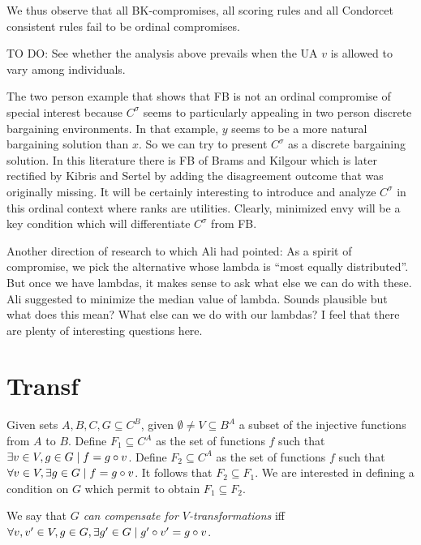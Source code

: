\documentclass[version=3.21, pagesize, notitlepage, twoside=off, bibliography=totoc, DIV=calc, fontsize=12pt, a4paper]{scrartcl}
\begin{document}
We thus observe that all BK-compromises, all scoring rules and all Condorcet consistent rules fail to be ordinal compromises.

TO DO: See whether the analysis above prevails when the UA $v$ is allowed to vary among individuals.

The two person example that shows that FB is not an ordinal compromise of special interest because $C^{\sigma }$ seems to particularly appealing in two person discrete bargaining environments. In that example, $y$ seems to be a more natural bargaining solution than $x$. So we can try to present $C^{\sigma }$ as a discrete bargaining solution. In this literature there is FB of Brams and Kilgour which is later rectified by Kibris and Sertel \cite{Sertel1999} by adding the disagreement outcome that was originally missing. It will be certainly interesting to introduce and analyze $C^{\sigma }$ in this ordinal context where ranks are utilities. Clearly, minimized envy will be a key condition which will differentiate $C^{\sigma }$ from FB.

Another direction of research to which Ali had pointed: As a spirit of compromise, we pick the alternative whose lambda is “most equally distributed”. But once we have lambdas, it makes sense to ask what else we can do with these. Ali suggested to minimize the median value of lambda. Sounds plausible but what does this mean? What else can we do with our lambdas? I feel that there are plenty of interesting questions here.




\appendix
\section{Transf}
Given sets $A, B, C, G \subseteq C^B$, given $\emptyset ≠ V \subseteq B^A$ a subset of the injective functions from $A$ to $B$. Define $F_1 \subseteq C^A$ as the set of functions $f$ such that $\exists v \in V, g \in G \suchthat f = g \circ v$. Define $F_2 \subseteq C^A$ as the set of functions $f$ such that $\forall v \in V, \exists g \in G \suchthat f = g \circ v$. It follows that $F_2 \subseteq F_1$. We are interested in defining a condition on $G$ which permit to obtain $F_1 \subseteq F_2$. 

We say that \emph{$G$ can compensate for $V$-transformations} iff $\forall v, v' \in V, g \in G, \exists g' \in G \suchthat g' \circ v' = g \circ v$.%
\end{document}
